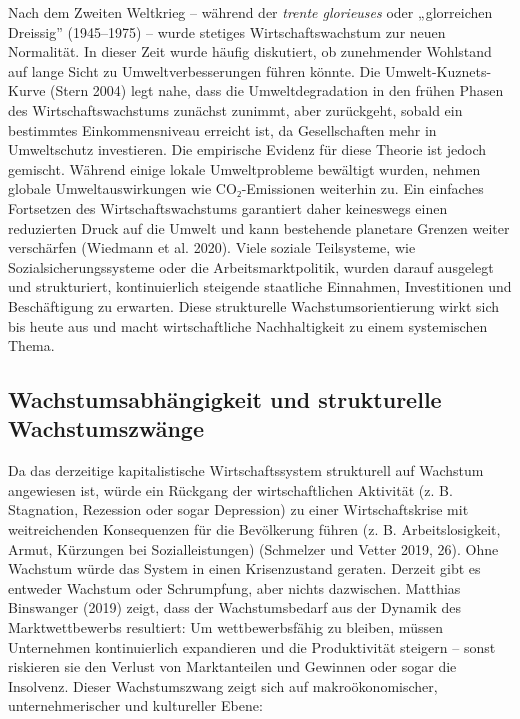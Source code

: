\documentclass[
  nswissgerman,
  a4paper,
  DIV=11,
  numbers=noendperiod,
  oneside,
  openany]{scrreprt}
\begin{document}
Nach dem Zweiten Weltkrieg -- während der \emph{trente glorieuses} oder
„glorreichen Dreissig'' (1945--1975) -- wurde stetiges
Wirtschaftswachstum zur neuen Normalität. In dieser Zeit wurde häufig
diskutiert, ob zunehmender Wohlstand auf lange Sicht zu
Umweltverbesserungen führen könnte. Die Umwelt-Kuznets-Kurve (Stern
2004) legt nahe, dass die Umweltdegradation in den frühen Phasen des
Wirtschaftswachstums zunächst zunimmt, aber zurückgeht, sobald ein
bestimmtes Einkommensniveau erreicht ist, da Gesellschaften mehr in
Umweltschutz investieren. Die empirische Evidenz für diese Theorie ist
jedoch gemischt. Während einige lokale Umweltprobleme bewältigt wurden,
nehmen globale Umweltauswirkungen wie CO₂-Emissionen weiterhin zu. Ein
einfaches Fortsetzen des Wirtschaftswachstums garantiert daher
keineswegs einen reduzierten Druck auf die Umwelt und kann bestehende
planetare Grenzen weiter verschärfen (Wiedmann et al. 2020). Viele
soziale Teilsysteme, wie Sozialsicherungssysteme oder die
Arbeitsmarktpolitik, wurden darauf ausgelegt und strukturiert,
kontinuierlich steigende staatliche Einnahmen, Investitionen und
Beschäftigung zu erwarten. Diese strukturelle Wachstumsorientierung
wirkt sich bis heute aus und macht wirtschaftliche Nachhaltigkeit zu
einem systemischen Thema.

\subsection{Wachstumsabhängigkeit und strukturelle
Wachstumszwänge}\label{wachstumsabhuxe4ngigkeit-und-strukturelle-wachstumszwuxe4nge}

Da das derzeitige kapitalistische Wirtschaftssystem strukturell auf
Wachstum angewiesen ist, würde ein Rückgang der wirtschaftlichen
Aktivität (z. B. Stagnation, Rezession oder sogar Depression) zu einer
Wirtschaftskrise mit weitreichenden Konsequenzen für die Bevölkerung
führen (z. B. Arbeitslosigkeit, Armut, Kürzungen bei Sozialleistungen)
(Schmelzer und Vetter 2019, 26). Ohne Wachstum würde das System in einen
Krisenzustand geraten. Derzeit gibt es entweder Wachstum oder
Schrumpfung, aber nichts dazwischen. Matthias Binswanger (2019) zeigt,
dass der Wachstumsbedarf aus der Dynamik des Marktwettbewerbs
resultiert: Um wettbewerbsfähig zu bleiben, müssen Unternehmen
kontinuierlich expandieren und die Produktivität steigern -- sonst
riskieren sie den Verlust von Marktanteilen und Gewinnen oder sogar die
Insolvenz. Dieser Wachstumszwang zeigt sich auf makroökonomischer,
unternehmerischer und kultureller Ebene:
\end{document}
